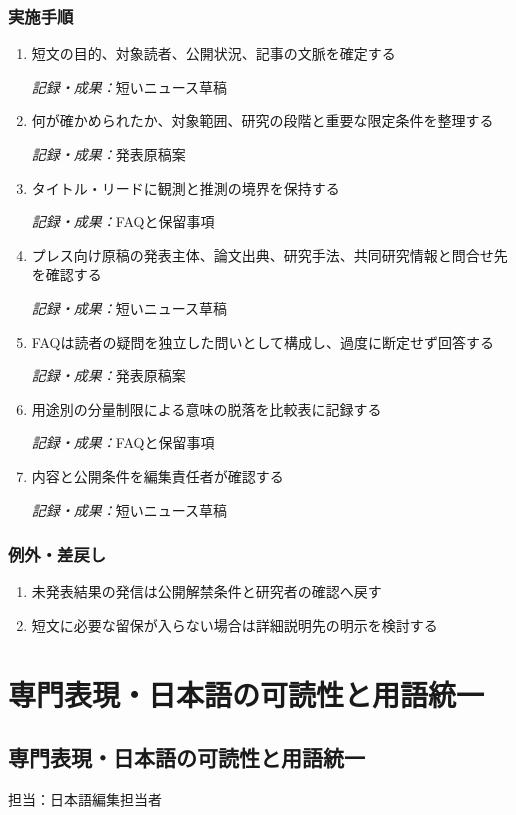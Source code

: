 \documentclass[a4paper,11pt]{article}
\begin{document}
\subsubsection*{実施手順}
\begin{enumerate}[leftmargin=2em,itemsep=0.65em]
\item 短文の目的、対象読者、公開状況、記事の文脈を確定する\par\noindent\textit{記録・成果：}短いニュース草稿\nobreak\smallskip
\item 何が確かめられたか、対象範囲、研究の段階と重要な限定条件を整理する\par\noindent\textit{記録・成果：}発表原稿案\nobreak\smallskip
\item タイトル・リードに観測と推測の境界を保持する\par\noindent\textit{記録・成果：}FAQと保留事項\nobreak\smallskip
\item プレス向け原稿の発表主体、論文出典、研究手法、共同研究情報と問合せ先を確認する\par\noindent\textit{記録・成果：}短いニュース草稿\nobreak\smallskip
\item FAQは読者の疑問を独立した問いとして構成し、過度に断定せず回答する\par\noindent\textit{記録・成果：}発表原稿案\nobreak\smallskip
\item 用途別の分量制限による意味の脱落を比較表に記録する\par\noindent\textit{記録・成果：}FAQと保留事項\nobreak\smallskip
\item 内容と公開条件を編集責任者が確認する\par\noindent\textit{記録・成果：}短いニュース草稿\nobreak\smallskip
\end{enumerate}
\subsubsection*{例外・差戻し}
\begin{enumerate}[leftmargin=2em,itemsep=0.35em]
\item 未発表結果の発信は公開解禁条件と研究者の確認へ戻す
\item 短文に必要な留保が入らない場合は詳細説明先の明示を検討する
\end{enumerate}
\section{専門表現・日本語の可読性と用語統一}
\subsection{専門表現・日本語の可読性と用語統一}
\par 担当：日本語編集担当者\par\medskip
\end{document}
